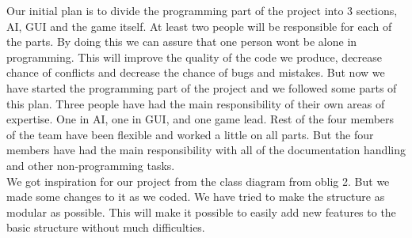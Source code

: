 \documentclass{article}
\begin{document}
    \noindent
    Our initial plan is to divide the programming part of the project into 3 sections, AI, GUI and the game itself. At least two people will be responsible for each of the parts. By doing this we can assure that one person wont be alone in programming. This will improve the quality of the code we produce, decrease chance of conflicts and decrease the chance of bugs and mistakes. But now we have started the programming part of the project and we followed some parts of this plan. Three people have had the main responsibility of their own areas of expertise. One in AI, one in GUI, and one game lead. Rest of the four members of the team have been flexible and worked a little on all parts. But the four members have had the main responsibility with all of the documentation handling and other non-programming tasks. \\
    \noindent
    We got inspiration for our project from the class diagram from oblig 2. But we made some changes to it as we coded. We have tried to make the structure as modular as possible. This will make it possible to easily add new features to the basic structure without much difficulties. \\
\end{document}

